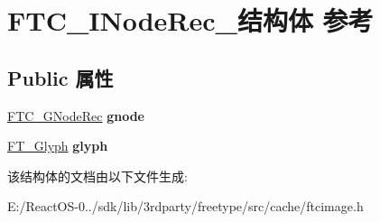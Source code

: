 \hypertarget{struct_f_t_c___i_node_rec__}{}\section{F\+T\+C\+\_\+\+I\+Node\+Rec\+\_\+结构体 参考}
\label{struct_f_t_c___i_node_rec__}
\subsection*{Public 属性}
\begin{DoxyCompactItemize}
\item 
\mbox{\label{struct_f_t_c___i_node_rec___a6a50cefe89c96afee41d23b075b7041d}} 
\hyperlink{struct_f_t_c___g_node_rec__}{F\+T\+C\+\_\+\+G\+Node\+Rec} {\bfseries gnode}
\item 
\mbox{\label{struct_f_t_c___i_node_rec___a7a007ab7794957b84d44dcc4af8f8713}} 
\hyperlink{struct_f_t___glyph_rec__}{F\+T\+\_\+\+Glyph} {\bfseries glyph}
\end{DoxyCompactItemize}


该结构体的文档由以下文件生成\+:\begin{DoxyCompactItemize}
\item 
E\+:/\+React\+O\+S-\/0../sdk/lib/3rdparty/freetype/src/cache/ftcimage.\+h\end{DoxyCompactItemize}

